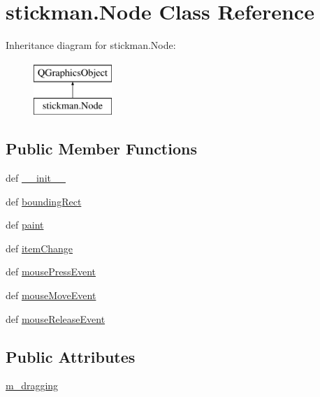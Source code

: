 \hypertarget{classstickman_1_1Node}{}\section{stickman.\+Node Class Reference}
\label{classstickman_1_1Node}
Inheritance diagram for stickman.\+Node\+:\begin{figure}[H]
\begin{center}
\leavevmode
\includegraphics[height=2.000000cm]{classstickman_1_1Node}
\end{center}
\end{figure}
\subsection*{Public Member Functions}
\begin{DoxyCompactItemize}
\item 
def \hyperlink{classstickman_1_1Node_abea56cf843b1e0f7688a0dc7dc00bee8}{\+\_\+\+\_\+init\+\_\+\+\_\+}
\item 
def \hyperlink{classstickman_1_1Node_aff4ed1df693e3591f19dd84c74c85f08}{bounding\+Rect}
\item 
def \hyperlink{classstickman_1_1Node_a38d887f8970e588039089ba6f1ab32db}{paint}
\item 
def \hyperlink{classstickman_1_1Node_a62d6b3a99fe8cc21259bbace136661d6}{item\+Change}
\item 
def \hyperlink{classstickman_1_1Node_a1aa8a3e6df6a8f1b35359dce08ac242c}{mouse\+Press\+Event}
\item 
def \hyperlink{classstickman_1_1Node_a083b8de44ebf356092a390ed8ba4f2e1}{mouse\+Move\+Event}
\item 
def \hyperlink{classstickman_1_1Node_a7ec177ed204191c950376e761bee36db}{mouse\+Release\+Event}
\end{DoxyCompactItemize}
\subsection*{Public Attributes}
\begin{DoxyCompactItemize}
\item 
\hyperlink{classstickman_1_1Node_ac3ed73b4acdb1c239caabfac552b4f2b}{m\+\_\+dragging}
\end{DoxyCompactItemize}
